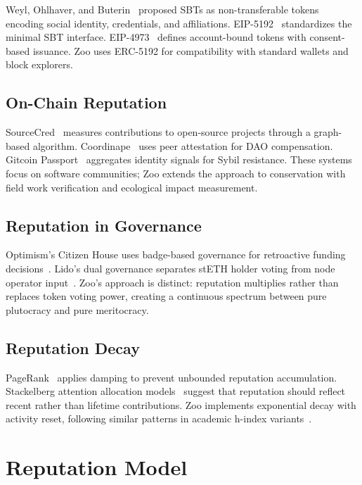 \documentclass[11pt,letterpaper]{article}
\begin{document}
Weyl, Ohlhaver, and Buterin~\cite{weyl2022decentralized} proposed SBTs as non-transferable tokens encoding social identity, credentials, and affiliations. EIP-5192~\cite{eip5192} standardizes the minimal SBT interface. EIP-4973~\cite{eip4973} defines account-bound tokens with consent-based issuance. Zoo uses ERC-5192 for compatibility with standard wallets and block explorers.

\subsection{On-Chain Reputation}

SourceCred~\cite{sourcecred2020} measures contributions to open-source projects through a graph-based algorithm. Coordinape~\cite{coordinape2021} uses peer attestation for DAO compensation. Gitcoin Passport~\cite{gitcoinpassport2023} aggregates identity signals for Sybil resistance. These systems focus on software communities; Zoo extends the approach to conservation with field work verification and ecological impact measurement.

\subsection{Reputation in Governance}

Optimism's Citizen House uses badge-based governance for retroactive funding decisions~\cite{optimism2023retropgf}. Lido's dual governance separates stETH holder voting from node operator input~\cite{lido2023dual}. Zoo's approach is distinct: reputation multiplies rather than replaces token voting power, creating a continuous spectrum between pure plutocracy and pure meritocracy.

\subsection{Reputation Decay}

PageRank~\cite{page1999pagerank} applies damping to prevent unbounded reputation accumulation. Stackelberg attention allocation models~\cite{jackson2008social} suggest that reputation should reflect recent rather than lifetime contributions. Zoo implements exponential decay with activity reset, following similar patterns in academic h-index variants~\cite{hirsch2005index}.

\section{Reputation Model}
\label{sec:model}
\end{document}
